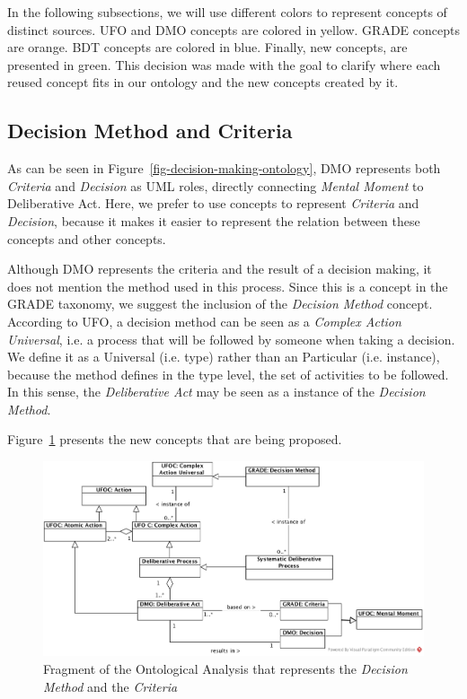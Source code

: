 In the following subsections, we will use different colors to represent concepts of distinct sources. UFO and DMO concepts are colored in yellow. GRADE concepts are orange. BDT concepts are colored in blue. Finally, new concepts, are presented in green. This decision was made with the goal to clarify where each reused concept fits in our ontology and the new concepts created by it.


\subsection{Decision Method and Criteria}

As can be seen in Figure~\ref{fig-decision-making-ontology}, DMO represents both \textit{Criteria} and \textit{Decision} as UML roles, directly connecting \textit{Mental Moment} to Deliberative Act. Here, we prefer to use concepts to represent \textit{Criteria} and \textit{Decision}, because it makes it easier to represent the relation between these concepts and other concepts. 

Although DMO represents the criteria and the result of a decision making, it does not mention the method used in this process. Since this is a concept in the GRADE taxonomy, we suggest the inclusion of the \textit{Decision Method} concept. According to UFO, a decision method can be seen as a \textit{Complex Action Universal}, i.e. a process that will be followed by someone when taking a decision. We define it as a Universal (i.e. type) rather than an Particular (i.e. instance), because the method defines in the type level, the set of activities to be followed. In this sense, the \textit{Deliberative Act} may be seen as a instance of the \textit{Decision Method}.

Figure~\ref{fig-ontology-criteria-decision-method2} presents the new concepts that are being proposed.
\begin{figure}
	\centering
	\includegraphics[width=\textwidth]{figuras/deliberative-process}
	\caption{Fragment of the Ontological Analysis that represents the \textit{Decision Method} and the \textit{Criteria}}
	\label{fig-ontology-criteria-decision-method2}
\end{figure}


